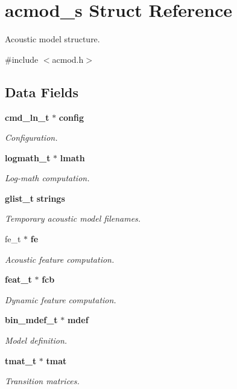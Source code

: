 \section{acmod\-\_\-s \-Struct \-Reference}
\label{structacmod__s}


\-Acoustic model structure.  




{\ttfamily \#include $<$acmod.\-h$>$}

\subsection*{\-Data \-Fields}
\begin{DoxyCompactItemize}
\item 
{\bf cmd\-\_\-ln\-\_\-t} $\ast$ {\bf config}
\begin{DoxyCompactList}\small\item\em \-Configuration. \end{DoxyCompactList}\item 
{\bf logmath\-\_\-t} $\ast$ {\bf lmath}
\begin{DoxyCompactList}\small\item\em \-Log-\/math computation. \end{DoxyCompactList}\item 
{\bf glist\-\_\-t} {\bf strings}
\begin{DoxyCompactList}\small\item\em \-Temporary acoustic model filenames. \end{DoxyCompactList}\item 
fe\-\_\-t $\ast$ {\bf fe}
\begin{DoxyCompactList}\small\item\em \-Acoustic feature computation. \end{DoxyCompactList}\item 
{\bf feat\-\_\-t} $\ast$ {\bf fcb}
\begin{DoxyCompactList}\small\item\em \-Dynamic feature computation. \end{DoxyCompactList}\item 
{\bf bin\-\_\-mdef\-\_\-t} $\ast$ {\bf mdef}
\begin{DoxyCompactList}\small\item\em \-Model definition. \end{DoxyCompactList}\item 
{\bf tmat\-\_\-t} $\ast$ {\bf tmat}
\begin{DoxyCompactList}\small\item\em \-Transition matrices. \end{DoxyCompactList}\item 

\end{DoxyCompactItemize}
